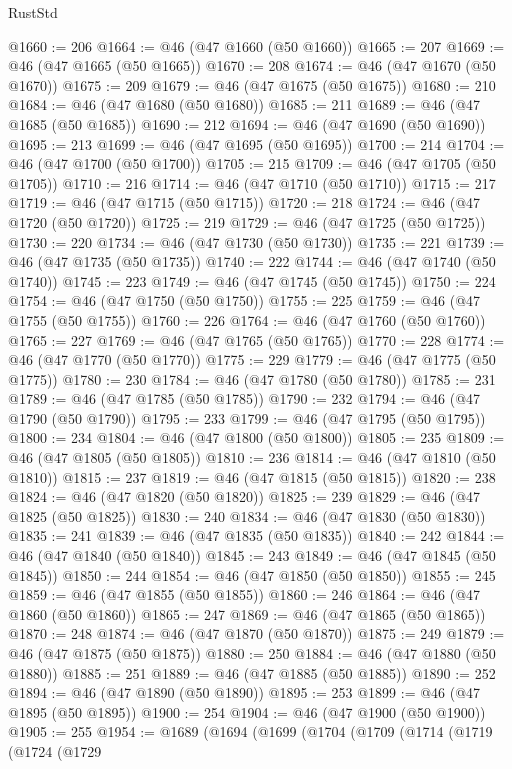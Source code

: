 \begin{lexlean}{RustStd}
\begin{coremodule}
@1660 := 206
@1664 := @46 (@47 @1660 (@50 @1660))
@1665 := 207
@1669 := @46 (@47 @1665 (@50 @1665))
@1670 := 208
@1674 := @46 (@47 @1670 (@50 @1670))
@1675 := 209
@1679 := @46 (@47 @1675 (@50 @1675))
@1680 := 210
@1684 := @46 (@47 @1680 (@50 @1680))
@1685 := 211
@1689 := @46 (@47 @1685 (@50 @1685))
@1690 := 212
@1694 := @46 (@47 @1690 (@50 @1690))
@1695 := 213
@1699 := @46 (@47 @1695 (@50 @1695))
@1700 := 214
@1704 := @46 (@47 @1700 (@50 @1700))
@1705 := 215
@1709 := @46 (@47 @1705 (@50 @1705))
@1710 := 216
@1714 := @46 (@47 @1710 (@50 @1710))
@1715 := 217
@1719 := @46 (@47 @1715 (@50 @1715))
@1720 := 218
@1724 := @46 (@47 @1720 (@50 @1720))
@1725 := 219
@1729 := @46 (@47 @1725 (@50 @1725))
@1730 := 220
@1734 := @46 (@47 @1730 (@50 @1730))
@1735 := 221
@1739 := @46 (@47 @1735 (@50 @1735))
@1740 := 222
@1744 := @46 (@47 @1740 (@50 @1740))
@1745 := 223
@1749 := @46 (@47 @1745 (@50 @1745))
@1750 := 224
@1754 := @46 (@47 @1750 (@50 @1750))
@1755 := 225
@1759 := @46 (@47 @1755 (@50 @1755))
@1760 := 226
@1764 := @46 (@47 @1760 (@50 @1760))
@1765 := 227
@1769 := @46 (@47 @1765 (@50 @1765))
@1770 := 228
@1774 := @46 (@47 @1770 (@50 @1770))
@1775 := 229
@1779 := @46 (@47 @1775 (@50 @1775))
@1780 := 230
@1784 := @46 (@47 @1780 (@50 @1780))
@1785 := 231
@1789 := @46 (@47 @1785 (@50 @1785))
@1790 := 232
@1794 := @46 (@47 @1790 (@50 @1790))
@1795 := 233
@1799 := @46 (@47 @1795 (@50 @1795))
@1800 := 234
@1804 := @46 (@47 @1800 (@50 @1800))
@1805 := 235
@1809 := @46 (@47 @1805 (@50 @1805))
@1810 := 236
@1814 := @46 (@47 @1810 (@50 @1810))
@1815 := 237
@1819 := @46 (@47 @1815 (@50 @1815))
@1820 := 238
@1824 := @46 (@47 @1820 (@50 @1820))
@1825 := 239
@1829 := @46 (@47 @1825 (@50 @1825))
@1830 := 240
@1834 := @46 (@47 @1830 (@50 @1830))
@1835 := 241
@1839 := @46 (@47 @1835 (@50 @1835))
@1840 := 242
@1844 := @46 (@47 @1840 (@50 @1840))
@1845 := 243
@1849 := @46 (@47 @1845 (@50 @1845))
@1850 := 244
@1854 := @46 (@47 @1850 (@50 @1850))
@1855 := 245
@1859 := @46 (@47 @1855 (@50 @1855))
@1860 := 246
@1864 := @46 (@47 @1860 (@50 @1860))
@1865 := 247
@1869 := @46 (@47 @1865 (@50 @1865))
@1870 := 248
@1874 := @46 (@47 @1870 (@50 @1870))
@1875 := 249
@1879 := @46 (@47 @1875 (@50 @1875))
@1880 := 250
@1884 := @46 (@47 @1880 (@50 @1880))
@1885 := 251
@1889 := @46 (@47 @1885 (@50 @1885))
@1890 := 252
@1894 := @46 (@47 @1890 (@50 @1890))
@1895 := 253
@1899 := @46 (@47 @1895 (@50 @1895))
@1900 := 254
@1904 := @46 (@47 @1900 (@50 @1900))
@1905 := 255
@1954 := @1689
    (@1694
      (@1699
        (@1704
          (@1709
            (@1714
              (@1719
                (@1724
                  (@1729

\end{coremodule}
\end{lexlean}
